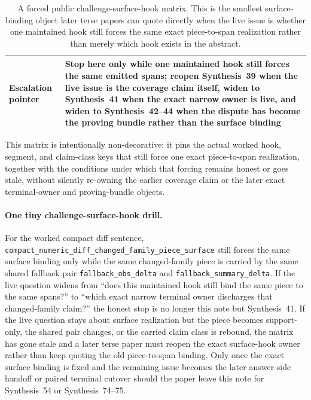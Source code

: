 \documentclass[11pt]{article}
\begin{document}
\begin{table}[t]
\begin{tabularx}{\linewidth}{@{}lX@{}}
Escalation pointer & Stop here only while one maintained hook still forces the same emitted spans; reopen Synthesis~39 when the live issue is the coverage claim itself, widen to Synthesis~41 when the exact narrow owner is live, and widen to Synthesis~42--44 when the dispute has become the proving bundle rather than the surface binding \\
\bottomrule
\end{tabularx}
\caption{A forced public challenge-surface-hook matrix. This is the smallest surface-binding object later terse papers can quote directly when the live issue is whether one maintained hook still forces the same exact piece-to-span realization rather than merely which hook exists in the abstract.}
\label{tab:forced-public-challenge-surface-hook-matrix}
\end{table}

This matrix is intentionally non-decorative: it pins the actual worked hook, segment, and claim-class keys that still force one exact piece-to-span realization, together with the conditions under which that forcing remains honest or goes stale, without silently re-owning the earlier coverage claim or the later exact terminal-owner and proving-bundle objects.\cite{series:workedexample}

\paragraph{One tiny challenge-surface-hook drill.}
For the worked compact diff sentence, \nolinkurl{compact_numeric_diff_changed_family_piece_surface} still forces the same surface binding only while the same changed-family piece is carried by the same shared fallback pair \nolinkurl{fallback_obs_delta} and \nolinkurl{fallback_summary_delta}. If the live question widens from ``does this maintained hook still bind the same piece to the same spans?'' to ``which exact narrow terminal owner discharges that changed-family claim?'' the honest stop is no longer this note but Synthesis~41. If the live question stays about surface realization but the piece becomes support-only, the shared pair changes, or the carried claim class is rebound, the matrix has gone stale and a later terse paper must reopen the exact surface-hook owner rather than keep quoting the old piece-to-span binding. Only once the exact surface binding is fixed and the remaining issue becomes the later answer-side handoff or paired terminal cutover should the paper leave this note for Synthesis~54 or Synthesis~74--75.\cite{series:workedexample}
\end{document}
